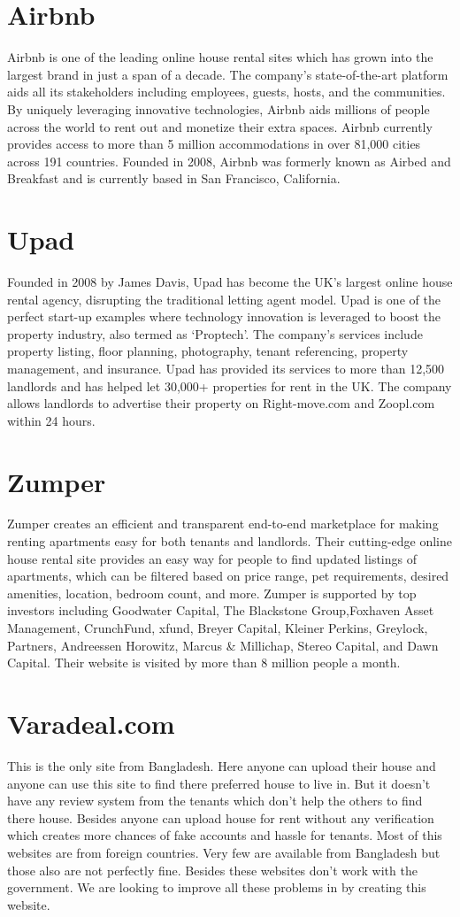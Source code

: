 \documentclass[12pt,a4paper]{report}
\begin{document}
\section{Airbnb}
Airbnb is one of the leading online house rental sites which has grown into the largest brand in
just a span of a decade. The company’s state-of-the-art platform aids all its stakeholders
including employees, guests, hosts, and the communities.  By uniquely leveraging innovative
technologies, Airbnb aids millions of people across the world to rent out and monetize their extra
spaces. Airbnb currently provides access to more than 5 million accommodations in over 81,000
cities across 191 countries. Founded in 2008, Airbnb was formerly known as Airbed and
Breakfast and is currently based in San Francisco, California.
\section{Upad}
Founded in 2008 by James Davis, Upad has become the UK’s largest online house rental agency,
disrupting the traditional letting agent model. Upad is one of the perfect start-up examples where
technology innovation is leveraged to boost the property industry, also termed as ‘Proptech’. The
company’s services include property listing, floor planning, photography, tenant referencing,
property management, and insurance. Upad has provided its services to more than 12,500
landlords and has helped let 30,000+ properties for rent in the UK. The company allows
landlords to advertise their property on Right-move.com and Zoopl.com within 24 hours.
\section{Zumper}
Zumper creates an efficient and transparent end-to-end marketplace for making renting
apartments easy for both tenants and landlords. Their cutting-edge online house rental site
provides an easy way for people to find updated listings of apartments, which can be filtered
based on price range, pet requirements, desired amenities, location, bedroom count, and more. Zumper is supported by top investors including Goodwater Capital, The Blackstone Group,Foxhaven Asset Management, CrunchFund, xfund, Breyer Capital, Kleiner Perkins, Greylock, Partners, Andreessen Horowitz, Marcus \& Millichap, Stereo Capital, and Dawn Capital. Their
website is visited by more than 8 million people a month.
\section{Varadeal.com}
This is the only site from Bangladesh. Here anyone can upload their house and anyone can use
this site to find there preferred house to live in. But it doesn’t have any review system from the
tenants which don’t help the others to find there house. Besides anyone can upload house for rent
without any verification which creates more chances of fake accounts and hassle for tenants.
Most of this websites are from foreign countries. Very few are available from Bangladesh but
those also are not perfectly fine. Besides these websites don’t work with the government. We are
looking to improve all these problems in by creating this website.
\newpage
\end{document}
